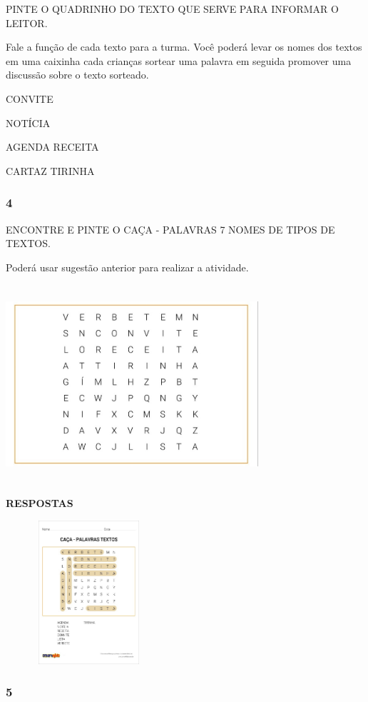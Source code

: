 PINTE O QUADRINHO DO TEXTO QUE SERVE PARA INFORMAR O LEITOR.

Fale a função de cada texto para a turma. Você poderá levar os nomes dos
textos em uma caixinha cada crianças sortear uma palavra em seguida
promover uma discussão sobre o texto sorteado.

CONVITE

NOTÍCIA

AGENDA RECEITA

CARTAZ TIRINHA

\subsubsection{4}\label{section-45}

ENCONTRE E PINTE O CAÇA - PALAVRAS 7 NOMES DE TIPOS DE TEXTOS.

Poderá usar sugestão anterior para realizar a atividade.

\includegraphics[width=3.68829in,height=2.89552in]{media/image104.jpeg}

\textbf{RESPOSTAS}

\includegraphics[width=2.42537in,height=2.09849in]{media/image105.jpeg}

\subsubsection{5}\label{section-46}


